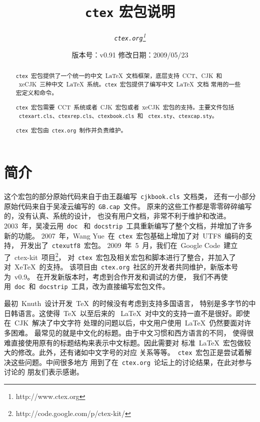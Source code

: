 \documentclass{ltxdoc}
\newcommand{\ctex}{\texttt{ctex}}
\newcommand{\ctexorg}{\texttt{ctex.org}}
\begin{document}
\title{\bf \ctex{} 宏包说明}
\author{\it \ctexorg\thanks{http://www.ctex.org}}
\date{\small 版本号：v0.91 \ccwd 修改日期：2009/05/23}
\maketitle


\begin{abstract}
\ctex{}~宏包提供了一个统一的中文~\LaTeX{}~文档框架，底层支持~CCT、CJK~和
~xeCJK~三种中文~\LaTeX{}~系统。\ctex{}~宏包提供了编写中文~\LaTeX{}~文档
常用的一些宏定义和命令。

\ctex{}~宏包需要~CCT~系统或者~CJK~宏包或者~xeCJK~宏包的支持。主要文件包括
~\texttt{ctexart.cls}、\texttt{ctexrep.cls}、\texttt{ctexbook.cls}~和
~\texttt{ctex.sty}、\texttt{ctexcap.sty}。

\ctex{}~宏包由~\ctexorg{}~制作并负责维护。
\end{abstract}

\tableofcontents

\section{简介}

这个宏包的部分原始代码来自于由王磊编写~\texttt{cjkbook.cls}~文档类，
还有一小部分原始代码来自于吴凌云编写的~\texttt{GB.cap}~文件。
原来的这些工作都是零零碎碎编写的，没有认真、系统的设计，
也没有用户文档，非常不利于维护和改进。2003~年，吴凌云用~\texttt{doc}~
和~\texttt{docstrip}~工具重新编写了整个文档，并增加了许多新的功能。
2007~年，Wang Yue~在~\ctex{}~宏包基础上增加了对~UTF8~编码的支持，
开发出了~\texttt{ctexutf8}~宏包。
2009~年~5~月，我们在~Google Code~建立了~ctex-kit~项目\footnote{http://code.google.com/p/ctex-kit/}，
对~\ctex{}~宏包及相关宏包和脚本进行了整合，并加入了对~Xe\TeX{}~的支持。
该项目由~\ctexorg{}~社区的开发者共同维护，新版本号为~v0.9。
在开发新版本时，考虑到合作开发和调试的方便，
我们不再使用~\texttt{doc}~和~\texttt{docstrip}~工具，改为直接编写宏包文件。

最初~Knuth~设计开发~\TeX{}~的时候没有考虑到支持多国语言，
特别是多字节的中日韩语言。这使得~\TeX{}~以至后来的
~\LaTeX{}~对中文的支持一直不是很好。即使在~CJK~解决了中文字符
处理的问题以后，中文用户使用~\LaTeX{}~仍然要面对许多困难。
最常见的就是中文化的标题。由于中文习惯和西方语言的不同，
使得很难直接使用原有的标题结构来表示中文标题。因此需要对
标准~\LaTeX{}~宏包做较大的修改。此外，还有诸如中文字号的对应
关系等等。~\ctex{}~宏包正是尝试着解决这些问题。中间很多地方
用到了在~\ctexorg{}~论坛上的讨论结果，在此对参与讨论的
朋友们表示感谢。
\end{document}

